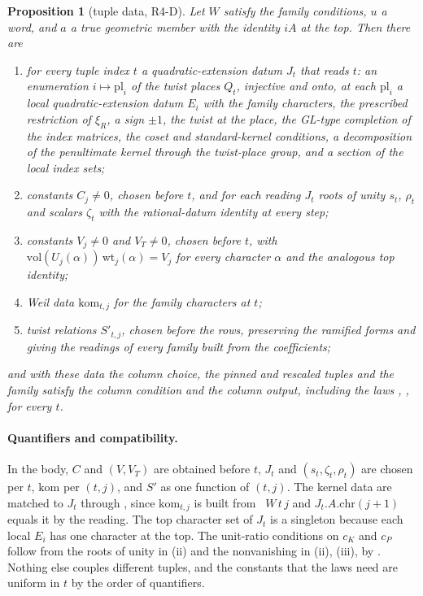 \documentclass[11pt]{article}
\newtheorem{proposition}[theorem]{Proposition}
\theoremstyle{remark}
\begin{document}
\begin{proposition}[tuple data, R4-D]\label{prop:r4d}
Let $W$ satisfy the family conditions, $u$ a word, and $a$ a true geometric member with the identity $iA$ at the top. Then there are
\begin{enumerate}[nosep,label=(\roman*)]
\item for every tuple index $t$ a quadratic-extension datum $J_t$ that reads $t$: an enumeration $i\mapsto\mathrm{pl}_i$ of the twist places $Q_t$, injective and onto, at each $\mathrm{pl}_i$ a local quadratic-extension datum $E_i$ with the family characters, the prescribed restriction of $\xi_R$, a sign $\pm1$, the twist at the place, the GL-type completion of the index matrices, the coset and standard-kernel conditions, a decomposition of the penultimate kernel through the twist-place group, and a section of the local index sets;
\item constants $C_j\neq0$, chosen before $t$, and for each reading $J_t$ roots of unity $s_t$, $\rho_t$ and scalars $\zeta_t$ with the rational-datum identity at every step;
\item constants $V_j\neq0$ and $V_T\neq0$, chosen before $t$, with $\mathrm{vol}(U_j(\alpha))\,\mathrm{wt}_j(\alpha)=V_j$ for every character $\alpha$ and the analogous top identity;
\item Weil data $\mathrm{kom}_{t,j}$ for the family characters at $t$;
\item twist relations $S'_{t,j}$, chosen before the rows, preserving the ramified forms and giving the readings of every family built from the coefficients;
\end{enumerate}
and with these data the column choice, the pinned and rescaled tuples and the family satisfy the column condition and the column output, including the laws , ,  for every $t$.
\end{proposition}

\paragraph{Quantifiers and compatibility.} In the body, $C$ and $(V,V_T)$ are obtained before $t$, $J_t$ and $(s_t,\zeta_t,\rho_t)$ are chosen per $t$, $\mathrm{kom}$ per $(t,j)$, and $S'$ as one function of $(t,j)$. The kernel data are matched to $J_t$ through , since $\mathrm{kom}_{t,j}$ is built from ~$W\,t\,j$ and $J_t.A.\mathrm{chr}(j+1)$ equals it by the reading. The top character set of $J_t$ is a singleton because each local $E_i$ has one character at the top. The unit-ratio conditions on $c_K$ and $c_P$ follow from the roots of unity in (ii) and the nonvanishing in (ii), (iii), by . Nothing else couples different tuples, and the constants that the laws need are uniform in $t$ by the order of quantifiers.
\end{document}
